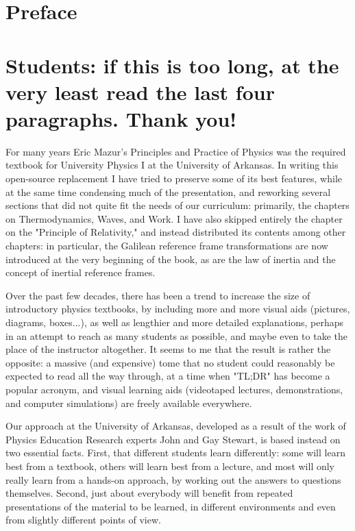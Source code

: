 \documentclass[10pt]{article}
\begin{document}
\section*{Preface}
\section*{Students: if this is too long, at the very least read the last four paragraphs. Thank you!}
For many years Eric Mazur's Principles and Practice of Physics was the required textbook for University Physics I at the University of Arkansas. In writing this open-source replacement I have tried to preserve some of its best features, while at the same time condensing much of the presentation, and reworking several sections that did not quite fit the needs of our curriculum: primarily, the chapters on Thermodynamics, Waves, and Work. I have also skipped entirely the chapter on the "Principle of Relativity," and instead distributed its contents among other chapters: in particular, the Galilean reference frame transformations are now introduced at the very beginning of the book, as are the law of inertia and the concept of inertial reference frames.

Over the past few decades, there has been a trend to increase the size of introductory physics textbooks, by including more and more visual aids (pictures, diagrams, boxes...), as well as lengthier and more detailed explanations, perhaps in an attempt to reach as many students as possible, and maybe even to take the place of the instructor altogether. It seems to me that the result is rather the opposite: a massive (and expensive) tome that no student could reasonably be expected to read all the way through, at a time when "TL;DR" has become a popular acronym, and visual learning aids (videotaped lectures, demonstrations, and computer simulations) are freely available everywhere.

Our approach at the University of Arkansas, developed as a result of the work of Physics Education Research experts John and Gay Stewart, is based instead on two essential facts. First, that different students learn differently: some will learn best from a textbook, others will learn best from a lecture, and most will only really learn from a hands-on approach, by working out the answers to questions themselves. Second, just about everybody will benefit from repeated presentations of the material to be learned, in different environments and even from slightly different points of view.
\end{document}
